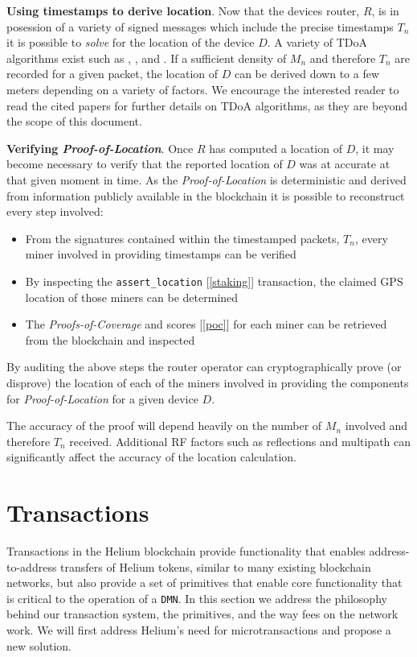 \documentclass[10pt, nonatbib, nocopyrightspace, reprint]{sigplanconf}
\newcommand{\secref}[1]{[\autoref{#1}]}
\begin{document}
\textbf{Using timestamps to derive location}. Now that the devices router, $R$, is in posession of a variety of signed messages which include the precise timestamps $T_n$ it is possible to \emph{solve} for the location of the device $D$. A variety of TDoA algorithms exist such as \cite{recurrent-tdoa}, \cite{acoustic-tdoa}, \cite{efficient-tdoa} and \cite{async-tdoa}. If a sufficient density of $M_n$ and therefore $T_n$ are recorded for a given packet, the location of $D$ can be derived down to a few meters depending on a variety of factors. We encourage the interested reader to read the cited papers for further details on TDoA algorithms, as they are beyond the scope of this document.

\textbf{Verifying \emph{Proof-of-Location}}. Once $R$ has computed a location of $D$, it may become necessary to verify that the reported location of $D$ was at accurate at that given moment in time. As the \emph{Proof-of-Location} is deterministic and derived from information publicly available in the blockchain it is possible to reconstruct every step involved:

\begin{itemize}
  \item From the signatures contained within the timestamped packets, $T_n$, every miner involved in providing timestamps can be verified
  \item By inspecting the \verb|assert_location| \secref{staking} transaction, the claimed GPS location of those miners can be determined
  \item The \emph{Proofs-of-Coverage} and scores \secref{poc} for each miner can be retrieved from the blockchain and inspected
\end{itemize}

By auditing the above steps the router operator can cryptographically prove (or disprove) the location of each of the miners involved in providing the components for \emph{Proof-of-Location} for a given device $D$.

The accuracy of the proof will depend heavily on the number of $M_n$ involved and therefore $T_n$ received. Additional RF factors such as reflections and multipath can significantly affect the accuracy of the location calculation.

\section{Transactions}\label{transactions}

Transactions in the Helium blockchain provide functionality that enables address-to-address transfers of Helium tokens, similar to many existing blockchain networks, but also provide a set of primitives that enable core functionality that is critical to the operation of a \verb|DMN|. In this section we address the philosophy behind our transaction system, the primitives, and the way fees on the network work. We will first address Helium's need for microtransactions and propose a new solution.
\end{document}
